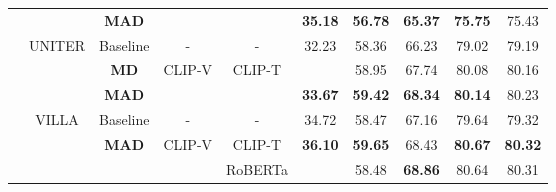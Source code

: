 \documentclass[runningheads]{llncs}
\begin{document}
\begin{table*}[h!]
{\begin{tabular}{|c|c|c|cc|cccc|c|}
                                                                                   & \multicolumn{1}{l|}{}                                                   & \textbf{MAD}                  & \multicolumn{1}{c|}{}                        &                         & \textbf{35.18} & \textbf{56.78} & \textbf{65.37} & \textbf{75.75} & 75.43          \\ \cline{2-10}
                                                                                   & UNITER                                                                  & Baseline                             & \multicolumn{1}{c|}{-}                       & -                       & 32.23          & 58.36          & 66.23          & 79.02          & 79.19          \\ \cline{3-5}
                                                                                   &                                                                         & \textbf{MD}                   & \multicolumn{1}{c|}{\multirow{2}{*}{CLIP-V}} & \multirow{2}{*}{CLIP-T} &                & 58.95          & 67.74          & 80.08          & 80.16          \\ \cline{3-3}
                                                                                   &                                                                         & \textbf{MAD}                  & \multicolumn{1}{c|}{}                        &                         & \textbf{33.67} & \textbf{59.42} & \textbf{68.34} & \textbf{80.14} & 80.23          \\ \cline{2-10}
                                                                                   & VILLA                                                                   & Baseline                             & \multicolumn{1}{c|}{-}                       & -                       & 34.72          & 58.47          & 67.16          & 79.64          & 79.32          \\ \cline{3-5}
                                                                                   &                                                                         & \multirow{3}{*}{\textbf{MAD}} & \multicolumn{1}{c|}{\multirow{2}{*}{CLIP-V}} & CLIP-T                  & \textbf{36.10} & \textbf{59.65} & 68.43          & \textbf{80.67} & \textbf{80.32} \\ \cline{5-5}
                                                                                   &                                                                         &                                      & \multicolumn{1}{c|}{}                        & RoBERTa                 &                & 58.48          & \textbf{68.86} & 80.64          & 80.31          \\ \cline{4-5}

\end{tabular}}
\end{table*}
\end{document}
